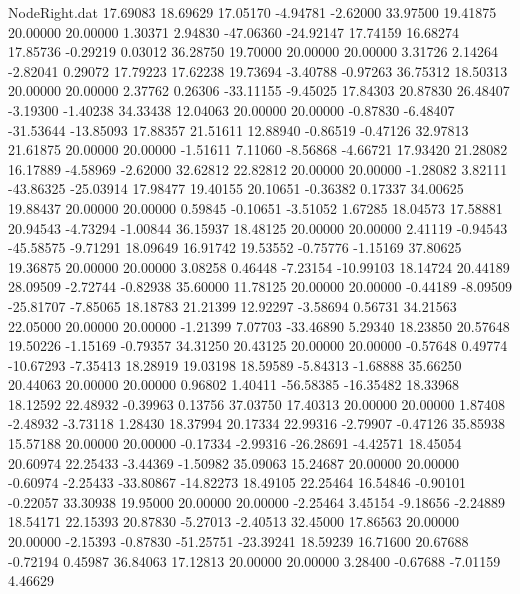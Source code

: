 \begin{filecontents}{NodeRight.dat}
  17.69083   18.69629   17.05170    -4.94781   -2.62000   33.97500   19.41875   20.00000   20.00000    1.30371    2.94830  -47.06360  -24.92147
  17.74159   16.68274   17.85736    -0.29219    0.03012   36.28750   19.70000   20.00000   20.00000    3.31726    2.14264   -2.82041    0.29072
  17.79223   17.62238   19.73694    -3.40788   -0.97263   36.75312   18.50313   20.00000   20.00000    2.37762    0.26306  -33.11155   -9.45025
  17.84303   20.87830   26.48407    -3.19300   -1.40238   34.33438   12.04063   20.00000   20.00000   -0.87830   -6.48407  -31.53644  -13.85093
  17.88357   21.51611   12.88940    -0.86519   -0.47126   32.97813   21.61875   20.00000   20.00000   -1.51611    7.11060   -8.56868   -4.66721
  17.93420   21.28082   16.17889    -4.58969   -2.62000   32.62812   22.82812   20.00000   20.00000   -1.28082    3.82111  -43.86325  -25.03914
  17.98477   19.40155   20.10651    -0.36382    0.17337   34.00625   19.88437   20.00000   20.00000    0.59845   -0.10651   -3.51052    1.67285
  18.04573   17.58881   20.94543    -4.73294   -1.00844   36.15937   18.48125   20.00000   20.00000    2.41119   -0.94543  -45.58575   -9.71291
  18.09649   16.91742   19.53552    -0.75776   -1.15169   37.80625   19.36875   20.00000   20.00000    3.08258    0.46448   -7.23154  -10.99103
  18.14724   20.44189   28.09509    -2.72744   -0.82938   35.60000   11.78125   20.00000   20.00000   -0.44189   -8.09509  -25.81707   -7.85065
  18.18783   21.21399   12.92297    -3.58694    0.56731   34.21563   22.05000   20.00000   20.00000   -1.21399    7.07703  -33.46890    5.29340
  18.23850   20.57648   19.50226    -1.15169   -0.79357   34.31250   20.43125   20.00000   20.00000   -0.57648    0.49774  -10.67293   -7.35413
  18.28919   19.03198   18.59589    -5.84313   -1.68888   35.66250   20.44063   20.00000   20.00000    0.96802    1.40411  -56.58385  -16.35482
  18.33968   18.12592   22.48932    -0.39963    0.13756   37.03750   17.40313   20.00000   20.00000    1.87408   -2.48932   -3.73118    1.28430
  18.37994   20.17334   22.99316    -2.79907   -0.47126   35.85938   15.57188   20.00000   20.00000   -0.17334   -2.99316  -26.28691   -4.42571
  18.45054   20.60974   22.25433    -3.44369   -1.50982   35.09063   15.24687   20.00000   20.00000   -0.60974   -2.25433  -33.80867  -14.82273
  18.49105   22.25464   16.54846    -0.90101   -0.22057   33.30938   19.95000   20.00000   20.00000   -2.25464    3.45154   -9.18656   -2.24889
  18.54171   22.15393   20.87830    -5.27013   -2.40513   32.45000   17.86563   20.00000   20.00000   -2.15393   -0.87830  -51.25751  -23.39241
  18.59239   16.71600   20.67688    -0.72194    0.45987   36.84063   17.12813   20.00000   20.00000    3.28400   -0.67688   -7.01159    4.46629

\end{filecontents}
